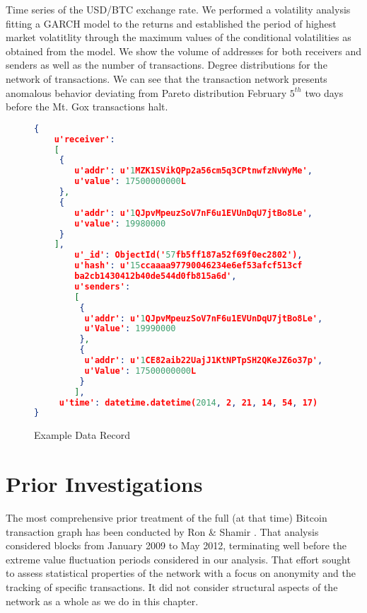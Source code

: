 Time series of the USD/BTC exchange rate. We performed a volatility analysis fitting a GARCH model to the returns and established the period of highest market volatitlity through the maximum values of the conditional volatilities as obtained from the model. We show the volume of addresses for both receivers and senders as well as the number of transactions.
Degree distributions for the network of transactions. We can see that the transaction network presents anomalous behavior deviating from Pareto distribution February $5^{th}$ two days before the Mt. Gox transactions halt.

\begin{figure}
  \centering
\begin{lstlisting}[language=json,firstnumber=1]
{
    u'receiver': 
    [  
     {
        u'addr': u'1MZK1SVikQPp2a56cm5q3CPtnwfzNvWyMe', 
        u'value': 17500000000L
     }, 
     {
        u'addr': u'1QJpvMpeuzSoV7nF6u1EVUnDqU7jtBo8Le', 
        u'value': 19980000
     }
    ], 
        u'_id': ObjectId('57fb5ff187a52f69f0ec2802'), 
        u'hash': u'15ccaaaa97790046234e6ef53afcf513cf
        ba2cb1430412b40de544d0fb815a6d', 
        u'senders': 
        [
         {
          u'addr': u'1QJpvMpeuzSoV7nF6u1EVUnDqU7jtBo8Le', 
          u'Value': 19990000
         }, 
         {
          u'addr': u'1CE82aib22UajJ1KtNPTpSH2QKeJZ6o37p',
          u'Value': 17500000000L
         }
        ], 
     u'time': datetime.datetime(2014, 2, 21, 14, 54, 17)
}
\end{lstlisting}
  \caption{Example Data Record}
\end{figure}

\section{Prior Investigations}

The most comprehensive prior treatment of the full (at that time) Bitcoin transaction graph has been conducted by Ron \& Shamir \cite{ron2013quantitative}. 
That analysis considered blocks from January 2009 to May 2012, terminating well before the extreme value fluctuation periods considered in our analysis.
That effort sought to assess statistical properties of the network with a focus on anonymity and the tracking of specific transactions. 
It did not consider structural aspects of the network as a whole as we do in this chapter. 

